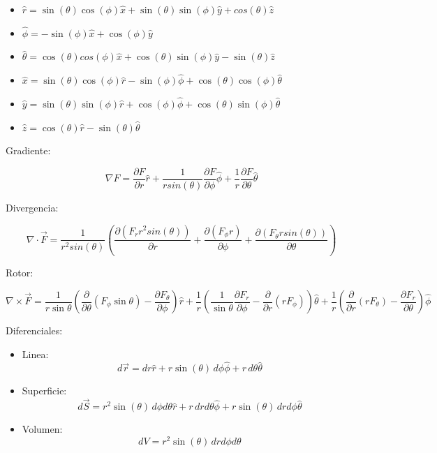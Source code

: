 \begin{itemize}
    \item $\hat{r} = \sin(\theta)\cos(\phi)\hat{x} + \sin(\theta)\sin(\phi)\hat{y} + cos(\theta)\hat{z}$
    \item $\hat{\phi} = -\sin(\phi)\hat{x}+\cos(\phi)\hat{y}$
    \item $\hat{\theta} = \cos(\theta)cos(\phi)\hat{x} + \cos(\theta)\sin(\phi)\hat{y}-\sin(\theta)\hat{z}$
    \item $\hat{x}=\sin{(\theta)\cos{(\phi)}}\hat{r}-\sin{(\phi)}\hat{\phi}+\cos{(\theta)}\cos{(\phi)}\hat{\theta}$
    \item $\hat{y}=\sin{(\theta)\sin{(\phi)}}\hat{r}+\cos{(\phi)}\hat{\phi}+\cos{(\theta)}\sin{(\phi)}\hat{\theta}$
    \item $\hat{z}=\cos{(\theta)}\hat{r}-\sin{(\theta)}\hat{\theta}$
\end{itemize}

\bigbreak

Gradiente:

\[\nabla F = \frac{\partial F}{\partial r}\hat{r} + \frac{1}{rsin(\theta)}\frac{\partial F}{\partial \phi}\hat{\phi} + \frac{1}{r}\frac{\partial F}{\partial \theta}\hat{\theta}\]

Divergencia:

\[\nabla \cdot \vec{F} = \frac{1}{r^2sin(\theta)}\left(\frac{\partial(F_{r}r^2sin(\theta))}{\partial r}+\frac{\partial (F_{\phi}r)}{\partial\phi}+\frac{\partial(F_{\theta}rsin(\theta))}{\partial \theta}\right)\]

Rotor:

\[\nabla\times\vec{F} = \frac{1}{r\sin\theta} \left( \frac{\partial}{\partial \theta} \left(F_\phi\sin\theta \right) - \frac{\partial F_\theta}{\partial \phi} \right) \hat{r} + \frac{1}{r} \left( \frac{1}{\sin\theta} \frac{\partial F_r}{\partial \phi} - \frac{\partial}{\partial r} \left( r F_\phi \right) \right) \hat{\theta} + \frac{1}{r} \left( \frac{\partial}{\partial r} \left( r F_{\theta} \right) - \frac{\partial F_r}{\partial \theta} \right) \hat{\phi}\]

Diferenciales:

\begin{itemize}
    \item Linea:
    \[d\vec{r} = dr\hat{r} + r\sin(\theta)\, d\phi\hat{\phi}+r\,d\theta\hat{\theta}\]
    \item Superficie:
    \[d\vec{S} = r^2\sin(\theta)\,d\phi d\theta\hat{r}+r\,drd\theta\hat{\phi}+r\sin(\theta)\,dr d\phi\hat{\theta}\]
    \item Volumen:
    \[dV = r^2\sin(\theta)\,dr d\phi d\theta\]
\end{itemize}

